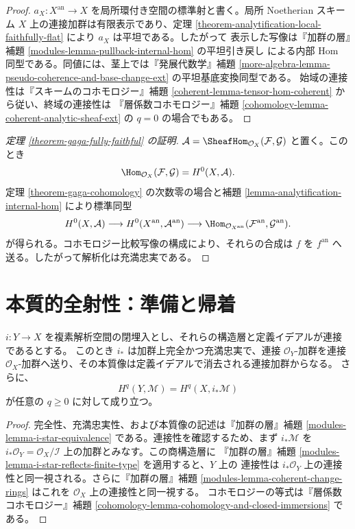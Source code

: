 \begin{proof}
$a_X:X^{\mathrm{an}}\to X$ を局所環付き空間の標準射と書く。局所 Noetherian スキーム
$X$ 上の連接加群は有限表示であり、定理
\ref{theorem-analytification-local-faithfully-flat} により $a_X$ は平坦である。したがって
表示した写像は『加群の層』補題 \ref{modules-lemma-pullback-internal-hom} の平坦引き戻し
による内部 Hom 同型である。同値には、茎上では『発展代数学』補題
\ref{more-algebra-lemma-pseudo-coherence-and-base-change-ext} の平坦基底変換同型である。
始域の連接性は『スキームのコホモロジー』補題
\ref{coherent-lemma-tensor-hom-coherent} から従い、終域の連接性は
『層係数コホモロジー』補題 \ref{cohomology-lemma-coherent-analytic-sheaf-ext} の
$q=0$ の場合でもある。
\end{proof}

\begin{proof}[定理 \ref{theorem-gaga-fully-faithful} の証明]
$\mathcal A=\SheafHom_{\mathcal O_X}(\mathcal F,\mathcal G)$ と置く。このとき
$$
\Hom_{\mathcal O_X}(\mathcal F,\mathcal G)
=H^0(X,\mathcal A).
$$
定理 \ref{theorem-gaga-cohomology} の次数零の場合と補題
\ref{lemma-analytification-internal-hom} により標準同型
$$
H^0(X,\mathcal A)
\longrightarrow H^0(X^{\mathrm{an}},\mathcal A^{\mathrm{an}})
\longrightarrow
\Hom_{\mathcal O_{X^{\mathrm{an}}}}
(\mathcal F^{\mathrm{an}},\mathcal G^{\mathrm{an}}).
$$
が得られる。コホモロジー比較写像の構成により、それらの合成は $f$ を
$f^{\mathrm{an}}$ へ送る。したがって解析化は充満忠実である。
\end{proof}

\section{本質的全射性：準備と帰着}
\label{section-gaga-essential-surjectivity-preliminaries}

\begin{lemma}
\label{lemma-coherent-analytic-closed-immersion}
$i:Y\to X$ を複素解析空間の閉埋入とし、それらの構造層と定義イデアルが連接であるとする。
このとき $i_*$ は加群上完全かつ充満忠実で、連接 $\mathcal O_Y$-加群を連接
$\mathcal O_X$-加群へ送り、その本質像は定義イデアルで消去される連接加群からなる。
さらに、
$$
H^q(Y,\mathcal M)=H^q(X,i_*\mathcal M)
$$
が任意の $q\geq0$ に対して成り立つ。
\end{lemma}

\begin{proof}
完全性、充満忠実性、および本質像の記述は『加群の層』補題
\ref{modules-lemma-i-star-equivalence} である。連接性を確認するため、まず
$i_*\mathcal M$ を $i_*\mathcal O_Y=\mathcal O_X/\mathcal I$ 上の加群とみなす。この商構造層に
『加群の層』補題 \ref{modules-lemma-i-star-reflects-finite-type} を適用すると、$Y$ 上の
連接性は $i_*\mathcal O_Y$ 上の連接性と同一視される。さらに『加群の層』補題
\ref{modules-lemma-coherent-change-rings} はこれを $\mathcal O_X$ 上の連接性と同一視する。
コホモロジーの等式は『層係数コホモロジー』補題
\ref{cohomology-lemma-cohomology-and-closed-immersions} である。
\end{proof}

